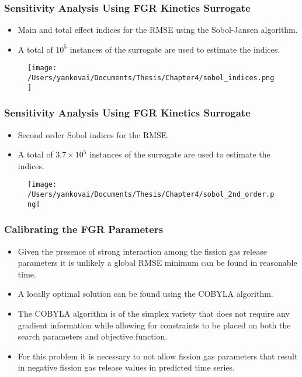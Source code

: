 \begin{frame}
\frametitle{Sensitivity Analysis Using FGR Kinetics Surrogate}

\begin{itemize}
  \item Main and total effect indices for the RMSE using the Sobol-Jansen algorithm. 
  \item A total of $10^5$ instances of the surrogate are used to estimate the indices.
\end{itemize}

\begin{figure}
  \texttt{[image: /Users/yankovai/Documents/Thesis/Chapter4/sobol\_indices.png]}
\end{figure}

\end{frame}
\begin{frame}
\frametitle{Sensitivity Analysis Using FGR Kinetics Surrogate}

\begin{itemize}
  \item Second order Sobol indices for the RMSE.
  \item A total of $3.7\times 10^5$ instances of the surrogate are used to estimate the indices.
\end{itemize}

\begin{figure}
  \texttt{[image: /Users/yankovai/Documents/Thesis/Chapter4/sobol\_2nd\_order.png]}
\end{figure}

\end{frame}
\begin{frame}
\frametitle{Calibrating the FGR Parameters}

\begin{itemize}
  \item Given the presence of strong interaction among the fission gas release parameters it is unlikely a global RMSE minimum can be found in reasonable time. 
  \item A locally optimal solution can be found using the COBYLA algorithm. 
  \item The COBYLA algorithm is of the simplex variety that does not require any gradient information while allowing for constraints to be placed on both the search parameters and objective function. 
  \item For this problem it is necessary to not allow fission gas parameters that result in negative fission gas release values in predicted time series. 
\end{itemize}

\end{frame}
